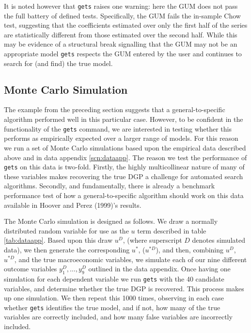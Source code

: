 \documentclass[bib]{statapress}
\begin{document}
It is noted however that \texttt{gets} raises one warning: here the GUM does 
not pass the full battery of defined tests.  Specifically, the GUM fails the 
in-sample Chow test, suggesting that the coefficients estimated over only the 
first half of the series are statistically different from those estimated over 
the second half.  While this may be evidence of a structural break signalling 
that the GUM may not be an appropriate model \texttt{gets} respects the GUM 
entered by the user and continues to search for (and find) the true model.

\begin{stlog}
\nullskip
\end{stlog}

\subsection{Monte Carlo Simulation}
The example from the preceding section suggests that a general-to-specific 
algorithm performed well in this particular case.  However, to be confident in
the functionality of the \texttt{gets} command, we are 
interested in testing whether this performs as empirically expected
over a larger range of models.  For this reason we run a set of Monte Carlo 
simulations based upon the empirical data described above and in data appendix
\ref{scn:dataapp}.  The reason we test the performance of \texttt{gets} on this
data is two-fold.  Firstly, the highly multicollinear nature of many of these 
variables makes recovering the true DGP a challenge for automated search 
algorithms.  Secondly, and fundamentally, there is already a benchmark 
performance test of how a general-to-specific algorithm should work on this 
data available in Hoover and Perez (1999)'s results.

The Monte Carlo simulation is designed as follows.  We draw a normally 
distributed random variable for use as the $u$ term described in table 
\ref{tab:dataapp}.  Based upon this draw $u^D$, (where superscript $D$ denotes
simulated data), we then generate the 
corresponding $u^*$, ($u^{*D}$), and then, combining $u^D$, $u^{*D}$, and the
true macroeconomic variables, we simulate each of our nine different outcome
variables $y_1^D,\ldots,y_9^D$ outlined in the data appendix.  Once having one
simulation for each dependent variable we run \texttt{gets} with the 40 
candidate variables, and determine whether the true DGP is recovered.  This
process makes up one simulation.  We then repeat this 1000 times, observing in 
each case whether \texttt{gets} identifies the true model, and if not, how many
of the true variables are correctly included, and how many false variables are 
incorrectly included.
\end{document}
